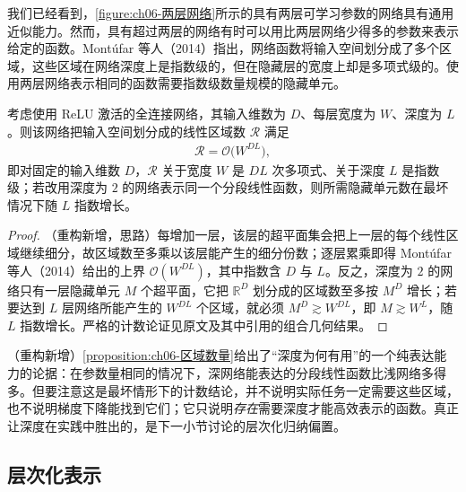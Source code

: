 \documentclass[../../main.tex]{subfiles}
\begin{document}
我们已经看到，\cref{figure:ch06-两层网络}所示的具有两层可学习参数的网络具有通用近似能力。然而，具有超过两层的网络有时可以用比两层网络少得多的参数来表示给定的函数。Montúfar 等人（2014）指出，网络函数将输入空间划分成了多个区域，这些区域在网络深度上是指数级的，但在隐藏层的宽度上却是多项式级的。使用两层网络表示相同的函数需要指数级数量规模的隐藏单元。

\begin{proposition}[分段线性区域数随深度指数增长]\label{proposition:ch06-区域数量}
考虑使用 ReLU 激活的全连接网络，其输入维数为 $D$、每层宽度为 $W$、深度为 $L$。则该网络把输入空间划分成的线性区域数 $\mathcal{R}$ 满足
\begin{align}
\mathcal{R}=\mathcal{O}\bigl(W^{DL}\bigr),
\label{align:ch06-区域数深度}
\end{align}
即对固定的输入维数 $D$，$\mathcal{R}$ 关于宽度 $W$ 是 $DL$ 次多项式、关于深度 $L$ 是指数级；若改用深度为 $2$ 的网络表示同一个分段线性函数，则所需隐藏单元数在最坏情况下随 $L$ 指数增长。
\end{proposition}

\begin{proof}
（重构新增，思路）每增加一层，该层的超平面集会把上一层的每个线性区域继续细分，故区域数至多乘以该层能产生的细分份数；逐层累乘即得 Montúfar 等人（2014）给出的上界 $\mathcal{O}(W^{DL})$，其中指数含 $D$ 与 $L$。反之，深度为 $2$ 的网络只有一层隐藏单元 $M$ 个超平面，它把 $\mathbb{R}^{D}$ 划分成的区域数至多按 $M^{D}$ 增长；若要达到 $L$ 层网络所能产生的 $W^{DL}$ 个区域，就必须 $M^{D}\gtrsim W^{DL}$，即 $M\gtrsim W^{L}$，随 $L$ 指数增长。严格的计数论证见原文及其中引用的组合几何结果。
\end{proof}

\begin{remark}（重构新增）\cref{proposition:ch06-区域数量}给出了“深度为何有用”的一个纯表达能力的论据：在参数量相同的情况下，深网络能表达的分段线性函数比浅网络多得多。但要注意这是最坏情形下的计数结论，并不说明实际任务一定需要这些区域，也不说明梯度下降能找到它们；它只说明\emph{存在}需要深度才能高效表示的函数。真正让深度在实践中胜出的，是下一小节讨论的层次化归纳偏置。
\end{remark}

\subsection{层次化表示}\label{subsection:ch06-层次化表示}
\end{document}
